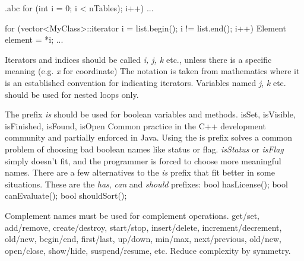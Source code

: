 \begin{filecontents*}{\jobname.abc}
	for (int i = 0; i < nTables); i++) {
		...
	}
	
	for (vector<MyClass>::iterator i = list.begin(); i != list.end(); i++) {
		Element element = *i;
		...
	}
\end{filecontents*}

\recommendation
{Iterators and indices should be called \textit{i, j, k} etc., unless there is a specific meaning (e.g. \textit{x} for coordinate)}
{}
{
	The notation is taken from mathematics where it is an established convention for indicating iterators.\newline
	Variables named \textit{j}, \textit{k} etc. should be used for nested loops only.
}

\recommendation
{The prefix \textit{is} should be used for boolean variables and methods.}
{isSet, isVisible, isFinished, isFound, isOpen}
{
	Common practice in the C++ development community and partially enforced in Java.\newline
	Using the is prefix solves a common problem of choosing bad boolean names like status or flag. \textit{isStatus} or \textit{isFlag} simply doesn't fit, and the programmer is forced to choose more meaningful names.\newline
	There are a few alternatives to the \textit{is} prefix that fit better in some situations. These are the \textit{has}, \textit{can} and \textit{should} prefixes:\newline
	bool hasLicense();\newline
	bool canEvaluate();\newline
	bool shouldSort();\newline
}

\recommendation
{Complement names must be used for complement operations.}
{
	get/set, add/remove, create/destroy, start/stop, insert/delete,
	increment/decrement, old/new, begin/end, first/last, up/down, min/max,
	next/previous, old/new, open/close, show/hide, suspend/resume, etc.
}
{Reduce complexity by symmetry.}

